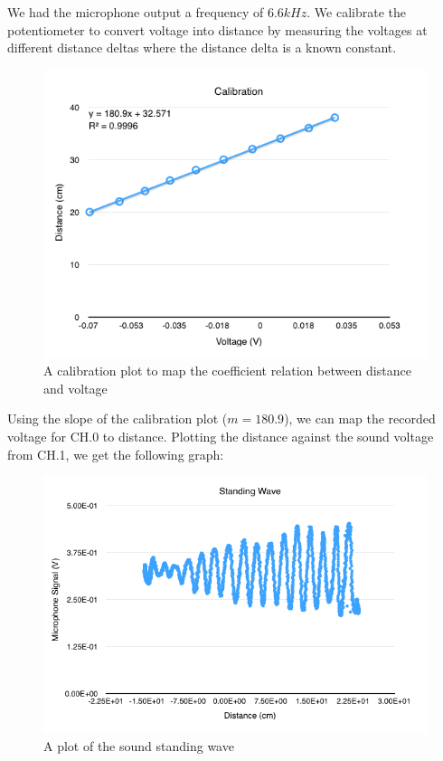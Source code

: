 \documentclass{article}
\begin{document}
We had the microphone output a frequency of $6.6kHz$. We calibrate the
potentiometer to convert voltage into distance by measuring the voltages at
different distance deltas where the distance delta is a known constant.

\begin{figure}[H]
    \centering
    \includegraphics[width=\textwidth]{charts/calibration}
    \caption{A calibration plot to map the coefficient relation between distance
    and voltage}
    \label{calibration}
\end{figure}

Using the slope of the calibration plot ($m=180.9$), we can map the recorded
voltage for CH.0 to distance. Plotting the distance against the sound voltage
from CH.1, we get the following graph:

\begin{figure}[H]
    \centering
    \includegraphics[width=\textwidth]{charts/standingwave_sound}
    \caption{A plot of the sound standing wave}
    \label{standingwave_sound}
\end{figure}
\end{document}
